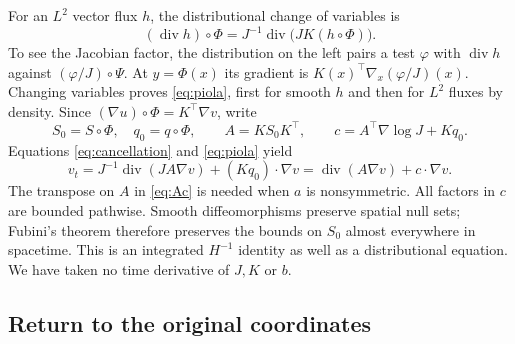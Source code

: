 \documentclass[11pt]{article}
\newcommand{\diver}{\operatorname{div}}
\begin{document}
For an $L^2$ vector flux $h$, the distributional change of variables is
\begin{equation}\label{eq:piola}
 (\diver h)\circ\Phi
   =J^{-1}\diver\bigl(JK(h\circ\Phi)\bigr).
\end{equation}
To see the Jacobian factor, the distribution on the left pairs a test
$\varphi$ with $\diver h$ against
$(\varphi/J)\circ\Psi$. At $y=\Phi(x)$ its gradient is
$K(x)^\top\nabla_x(\varphi/J)(x)$. Changing variables proves
\eqref{eq:piola}, first for smooth $h$ and then for $L^2$ fluxes by
density. Since $(\nabla u)\circ\Phi=K^\top\nabla v$, write
\begin{equation}\label{eq:Ac}
 S_0=S\circ\Phi,\quad q_0=q\circ\Phi,\qquad
 A=KS_0K^\top,\qquad
 c=A^\top\nabla\log J+Kq_0.
\end{equation}
Equations \eqref{eq:cancellation} and \eqref{eq:piola} yield
\begin{equation}\label{eq:transformed}
 v_t=J^{-1}\diver(JA\nabla v)+(Kq_0)\cdot\nabla v
     =\diver(A\nabla v)+c\cdot\nabla v.
\end{equation}
The transpose on $A$ in \eqref{eq:Ac} is needed when $a$ is nonsymmetric.
All factors in $c$ are bounded pathwise. Smooth diffeomorphisms preserve
spatial null sets; Fubini's theorem therefore preserves the bounds on
$S_0$ almost everywhere in spacetime. This is an integrated
$H^{-1}$ identity as well as a distributional equation. We have taken
no time derivative of $J,K$ or $b$.

\subsection{Return to the original coordinates}
\end{document}
